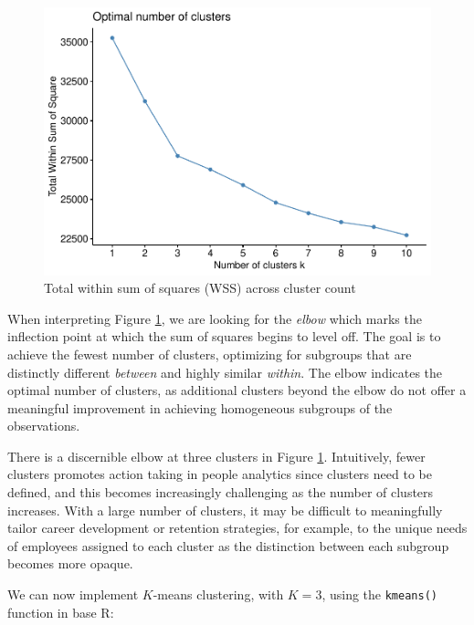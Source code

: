 \documentclass[
]{book}
\begin{document}
\begin{figure}

{\centering \includegraphics[width=1\linewidth]{The_Fundamentals_of_People_Analytics_files/figure-latex/kmeans-elbow-plot-1} 

}

\caption{Total within sum of squares (WSS) across cluster count}\label{fig:kmeans-elbow-plot}
\end{figure}

When interpreting Figure \ref{fig:kmeans-elbow-plot}, we are looking for the \emph{elbow} which marks the inflection point at which the sum of squares begins to level off. The goal is to achieve the fewest number of clusters, optimizing for subgroups that are distinctly different \emph{between} and highly similar \emph{within}. The elbow indicates the optimal number of clusters, as additional clusters beyond the elbow do not offer a meaningful improvement in achieving homogeneous subgroups of the observations.

There is a discernible elbow at three clusters in Figure \ref{fig:kmeans-elbow-plot}. Intuitively, fewer clusters promotes action taking in people analytics since clusters need to be defined, and this becomes increasingly challenging as the number of clusters increases. With a large number of clusters, it may be difficult to meaningfully tailor career development or retention strategies, for example, to the unique needs of employees assigned to each cluster as the distinction between each subgroup becomes more opaque.

We can now implement \(K\)-means clustering, with \(K = 3\), using the \texttt{kmeans()} function in base R:
\end{document}
